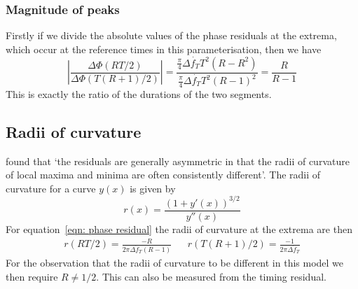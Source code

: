 \documentclass[/home/greg/Thesis/main/main.tex]{subfiles}
\begin{document}
\subsubsection{Magnitude of peaks}
Firstly if we divide the absolute values of the phase residuals at the extrema, which occur at the reference
times in this parameterisation, then we have
\begin{equation}
    \left|\frac{\Delta\Phi\left(RT/2\right)}{\Delta\Phi\left(T(R+1)/2\right)}\right|
    = \frac{\frac{\pi}{4}\Delta\dot{f_{T}} T^{2}(R-R^{2})}{\frac{\pi}{4}\Delta\dot{f_{T}} T^{2}(R-1)^{2}}
= \frac{R}{R-1}
\end{equation}
This is exactly the ratio of the durations of the two segments.  


\subsection{Radii of curvature}
\citet{Hobbs2010} found that `the residuals are generally asymmetric in that the radii 
of curvature of local maxima and minima are often consistently different'. The radii of curvature
for a curve $y(x)$ is given by 
\begin{equation}
    r(x) = \frac{\left(1 + y'(x)\right)^{3/2}}{y''(x)}
\end{equation}
For equation~\eqref{eqn: phase residual}  the radii of curvature at the extrema are then
\begin{align}
    r\left(RT/2\right) = \frac{-R}{2\pi\Delta{\dot{f}_{T}}(R-1)} && 
    r\left(T(R+1)/2\right) =  \frac{-1}{2\pi\Delta{\dot{f}_{T}}} 
\end{align}
For the observation that the radii of curvature to be different in this model we then require $R\ne 1/2$. 
This can also be measured from the timing residual.
\end{document}
